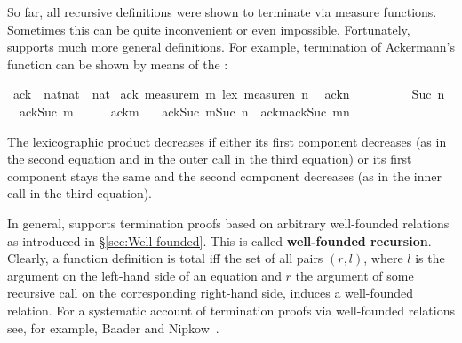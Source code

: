 %
\begin{isabellebody}%
\def\isabellecontext{WFrec}%
%
\begin{isamarkuptext}%
\noindent
So far, all recursive definitions were shown to terminate via measure
functions. Sometimes this can be quite inconvenient or even
impossible. Fortunately,  supports much more
general definitions. For example, termination of Ackermann's function
can be shown by means of the  :%
\end{isamarkuptext}%
\ ack\ {\isacharcolon}{\isacharcolon}\ {\isachardoublequote}nat{\isasymtimes}nat\ {\isasymRightarrow}\ nat{\isachardoublequote}\isanewline
{}\ ack\ {\isachardoublequote}measure{\isacharparenleft}{\isasymlambda}m{\isachardot}\ m{\isacharparenright}\ {\isacharless}{\isacharasterisk}lex{\isacharasterisk}{\isachargreater}\ measure{\isacharparenleft}{\isasymlambda}n{\isachardot}\ n{\isacharparenright}{\isachardoublequote}\isanewline
\ \ {\isachardoublequote}ack{\isacharparenleft}{}{\isacharcomma}n{\isacharparenright}\ \ \ \ \ \ \ \ \ {\isacharequal}\ Suc\ n{\isachardoublequote}\isanewline
\ \ {\isachardoublequote}ack{\isacharparenleft}Suc\ m{\isacharcomma}{}{\isacharparenright}\ \ \ \ \ {\isacharequal}\ ack{\isacharparenleft}m{\isacharcomma}\ {}{\isacharparenright}{\isachardoublequote}\isanewline
\ \ {\isachardoublequote}ack{\isacharparenleft}Suc\ m{\isacharcomma}Suc\ n{\isacharparenright}\ {\isacharequal}\ ack{\isacharparenleft}m{\isacharcomma}ack{\isacharparenleft}Suc\ m{\isacharcomma}n{\isacharparenright}{\isacharparenright}{\isachardoublequote}%
\begin{isamarkuptext}%
\noindent
The lexicographic product decreases if either its first component
decreases (as in the second equation and in the outer call in the
third equation) or its first component stays the same and the second
component decreases (as in the inner call in the third equation).

In general,  supports termination proofs based on
arbitrary well-founded relations as introduced in \S\ref{sec:Well-founded}.
This is called \textbf{well-founded
recursion}. Clearly, a function definition
is total iff the set of all pairs $(r,l)$, where $l$ is the argument on the
left-hand side of an equation and $r$ the argument of some recursive call on
the corresponding right-hand side, induces a well-founded relation.  For a
systematic account of termination proofs via well-founded relations see, for
example, Baader and Nipkow~\cite{Baader-Nipkow}.


\end{isamarkuptext}
\end{isabellebody}
